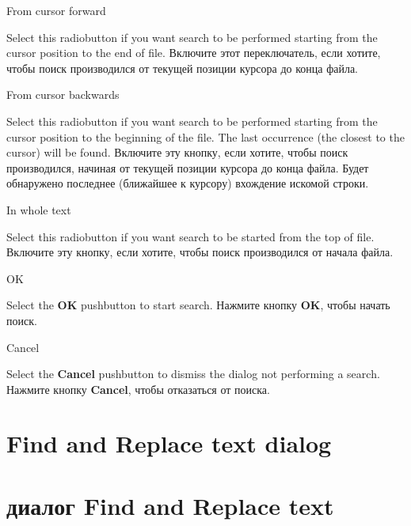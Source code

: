 \begin{popup}
\caption{From cursor forward}

\ifenglish
Select this radiobutton if you want search to be performed
starting from the cursor position to the end of file.
\else
Включите этот переключатель, если хотите, чтобы поиск производился 
от текущей позиции курсора до конца файла. 
\fi
\end{popup}

\begin{popup}
\caption{From cursor backwards}

\ifenglish
Select this radiobutton if you want search to be performed
starting from the cursor position to the beginning of the file.
The last occurrence (the closest to the cursor) will be found.
\else
Включите эту кнопку, если хотите, чтобы поиск производился, начиная от текущей
позиции курсора до конца файла. Будет обнаружено последнее (ближайшее к 
курсору) вхождение искомой строки.
\fi
\end{popup}

\begin{popup}
\caption{In whole text}

\ifenglish
Select this radiobutton if you want search to be started
from the top of file.
\else
Включите эту кнопку, если хотите, чтобы поиск производился от начала файла.
\fi
\end{popup}

\begin{popup}
\caption{OK}

\ifenglish
Select the {\bf OK} pushbutton to start search.
\else
Нажмите кнопку {\bf OK}, чтобы начать поиск.
\fi
\end{popup}

\begin{popup}
\caption{Cancel}

\ifenglish
Select the {\bf Cancel} pushbutton to dismiss the dialog not performing a
search.
\else
Нажмите кнопку {\bf Cancel}, чтобы отказаться от поиска. 
\fi
\end{popup}


\ifenglish
\section{Find and Replace text dialog}
\else
\section{диалог Find and Replace text}
\fi
{}

